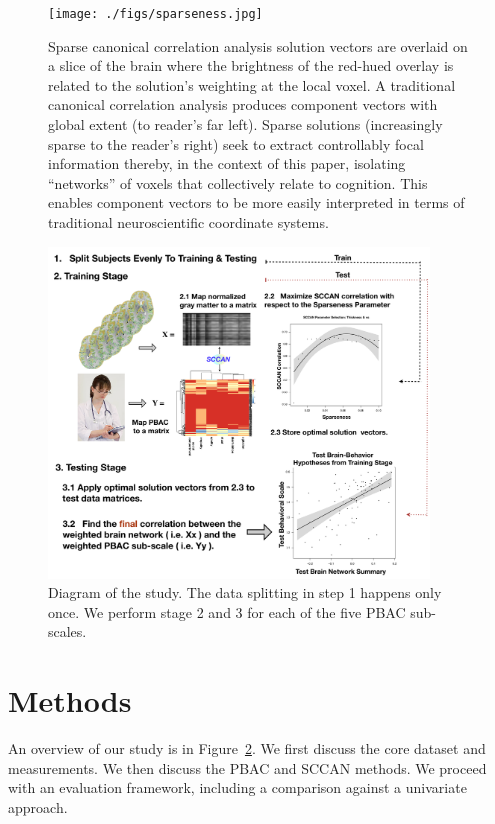 \documentclass[preprint,authoryear,12pt]{elsarticle}
\begin{document}
\begin{figure}[th] \centering
\texttt{[image: ./figs/sparseness.jpg]}
\caption{Sparse canonical correlation analysis solution vectors are overlaid on a slice of the brain where the brightness of the red-hued overlay is related to the solution's weighting at the local voxel. A traditional canonical correlation analysis produces component vectors with global extent (to reader's far left).  Sparse solutions (increasingly sparse to the reader's right) seek to extract controllably focal information thereby, in the context of this paper, isolating ``networks'' of voxels that collectively relate to cognition.  This enables component vectors to be more easily interpreted in terms of traditional neuroscientific coordinate systems.}
\label{fig:sparseness}
\end{figure}

\begin{figure}[th] \centering
\includegraphics[width=0.9\textwidth]{./figs/sccan_study.pdf}
\caption{Diagram of the study.  The data splitting in step 1 happens only once.  We perform stage 2 and 3 for each of the five PBAC sub-scales.}
\label{fig:study}
\end{figure}

\section{Methods} An overview of our study is in Figure~\ref{fig:study}.  We first discuss the core dataset and measurements.  We then discuss the PBAC and SCCAN methods.  We proceed with an evaluation framework, including a comparison against a univariate approach.
\end{document}
